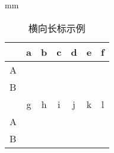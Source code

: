 \begin{table}[htbp]
  \centering\wuhao
  \caption{横向长标示例}\hspace{100mm}mm\\
  \begin{tabular}{p{4.0em}cccccc}
    \toprule
    \multicolumn{1}{c}{} & \multicolumn{1}{p{4.0em}}{a}  & \multicolumn{1}{p{4.0em}}{b} & \multicolumn{1}{p{4.0em}}{c} & \multicolumn{1}{p{4.0em}}{d} & \multicolumn{1}{p{4.0em}}{e} & \multicolumn{1}{p{4.0em}}{f} \\
    \midrule
    A                    &                               &                              &                              &                              &                              &                              \\
    B                    &                               &                              &                              &                              &                              &                              \\
    \midrule
    \midrule
    \multicolumn{1}{c}{} & \multicolumn{1}{p{4.0em}}{g } & \multicolumn{1}{p{4.0em}}{h} & \multicolumn{1}{p{4.0em}}{i} & \multicolumn{1}{p{4.0em}}{j} & \multicolumn{1}{p{4.0em}}{k} & \multicolumn{1}{p{4.0em}}{l} \\
    \midrule
    A                    &                               &                              &                              &                              &                              &                              \\
    B                    &                               &                              &                              &                              &                              &                              \\
    \bottomrule
  \end{tabular}%
  \label{tab:tbl-1-1}%
\end{table}%

